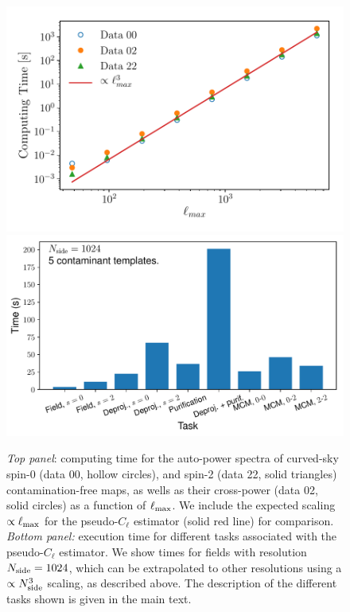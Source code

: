 \documentclass[usenatbib]{mnrasb}
\begin{document}
     \begin{figure}
       \centering
       \includegraphics[width=0.99\columnwidth]{time_scaling}
       \includegraphics[width=0.99\columnwidth]{timing}
       \caption{{\sl Top panel}: computing time for the auto-power spectra of curved-sky spin-0 (data 00, hollow circles), and spin-2 (data 22, solid triangles) contamination-free maps, as wells as their cross-power (data 02, solid circles) as a function of $\ell_{\rm max}$. We include the expected scaling $\propto\ell_{\rm max}$ for the pseudo-$C_{\ell}$ estimator (solid red line) for comparison. {\sl Bottom panel:} execution time for different tasks associated with the pseudo-$C_\ell$ estimator. We show times for fields with resolution $N_{\rm side}=1024$, which can be extrapolated to other resolutions using a $\propto N_{\rm side}^3$ scaling, as described above. The description of the different tasks shown is given in the main text.}\label{fig:scaling_lmax}
     \end{figure}

\bsp
\end{document}
